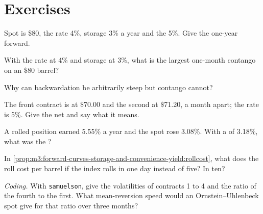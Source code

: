 \section{Exercises}

\begin{exercise}[$\star$]\label{exo:m3:forward-curves-storage-and-convenience-yield:1}
Spot is \$80, the rate 4\%, storage 3\% a year and the  5\%. Give the one-year
forward.
\end{exercise}

\begin{exercise}[$\star$]\label{exo:m3:forward-curves-storage-and-convenience-yield:2}
With the rate at 4\% and storage at 3\%, what is the largest one-month contango on an \$80 barrel?
\end{exercise}

\begin{exercise}[$\star$]\label{exo:m3:forward-curves-storage-and-convenience-yield:3}
Why can backwardation be arbitrarily steep but contango cannot?
\end{exercise}

\begin{exercise}[$\star\star$]\label{exo:m3:forward-curves-storage-and-convenience-yield:4}
The front contract is at \$70.00 and the second at \$71.20, a month apart; the rate is 5\%. Give the
net  and say what it means.
\end{exercise}

\begin{exercise}[$\star\star$]\label{exo:m3:forward-curves-storage-and-convenience-yield:5}
A rolled position earned 5.55\% a year and the spot rose 3.08\%. With a  of 3.18\%,
what was the ?
\end{exercise}

\begin{exercise}[$\star\star$]\label{exo:m3:forward-curves-storage-and-convenience-yield:6}
In \cref{prop:m3:forward-curves-storage-and-convenience-yield:rollcost}, what does the roll cost per barrel
if the index rolls in one day instead of five? In ten?
\end{exercise}

\begin{exercise}[$\star\star\star$]\label{exo:m3:forward-curves-storage-and-convenience-yield:7}
\emph{Coding.} With \texttt{samuelson}, give the volatilities of contracts 1 to 4 and the ratio of the
fourth to the first. What mean-reversion speed would an Ornstein--Uhlenbeck spot give for that ratio
over three months?
\end{exercise}


